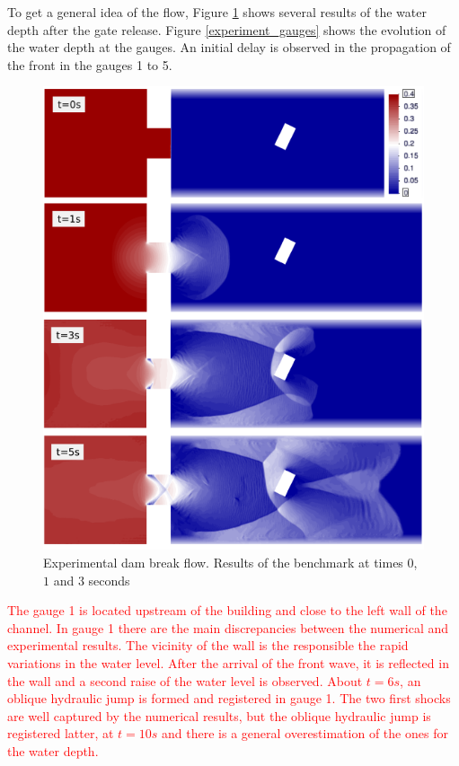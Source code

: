 \documentclass[a4paper,12pt]{elsarticle}
\newcommand{\Miguel}[1]{\textcolor{red}{#1}}
\begin{document}
To get a general idea of the flow, Figure \ref{experiment_plots} shows several results of the water depth after the gate release. Figure \ref{experiment_gauges} shows the evolution of the water depth at the gauges. An initial delay is observed in the propagation of the front in the gauges 1 to 5.

\begin{figure}
\centering
\includegraphics[width=\textwidth]{img/exp/results.png}
\caption{Experimental dam break flow. Results of the benchmark at times $0$, $1$ and $3$ seconds}
\label{experiment_plots}
\end{figure}


\Miguel{
The gauge 1 is located upstream of the building and close to the left wall of the channel. In gauge 1 there are the main discrepancies between the numerical and experimental results. The vicinity of the wall is the responsible the rapid variations in the water level. After the arrival of the front wave, it is reflected in the wall and a second raise of the water level is observed. About $t=6s$, an oblique hydraulic jump is formed and registered in gauge 1. The two first shocks are well captured by the numerical results, but the oblique hydraulic jump is registered latter, at $t=10s$ and there is a general overestimation of the ones for the water depth.
}
\end{document}
